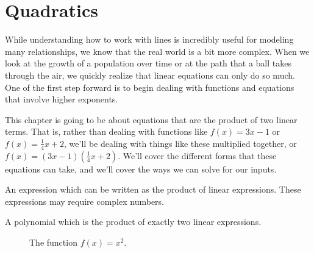 \chapter{Quadratics}

While understanding how to work with lines is incredibly useful for modeling many relationships, we know that the real world is a bit more complex.  When we look at the growth of a population over time or at the path that a ball takes through the air, we quickly realize that linear equations can only do so much.  One of the first step forward is to begin dealing with functions and equations that involve higher exponents.  

This chapter is going to be about equations that are the product of two linear terms.  That is, rather than dealing with functions like $f(x) = 3x - 1$ or $f(x) = \frac{1}{4}x + 2$, we'll be dealing with things like these multiplied together, or $f(x) = (3x-1)(\frac{1}{4}x + 2)$.  We'll cover the different forms that these equations can take, and we'll cover the ways we can solve for our inputs.

\begin{presentation}
\begin{defn}[Polynomial]
An expression which can be written as the product of linear expressions.  These expressions may require complex numbers.
\end{defn}
\end{presentation}

\begin{defn}[Quadratic]
A polynomial which is the product of exactly two linear expressions.
\end{defn}


\begin{wrapfigure}[13]{r}{0cm}
\caption{The function $f(x)=x^2$.}\label{Squaring Function}
\end{wrapfigure}

